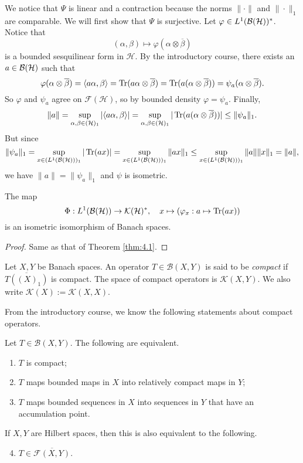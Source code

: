 \begin{myproof}
  We notice that $\Psi$ is linear and a contraction because the norms $\|\cdot \|$
  and $\| \cdot \|_1$ are comparable. We will first show that $\Psi$ is surjective.
  Let $\varphi \in L^1 (\operatorname{\mathcal{B} (\mathcal{H})})^*$. Notice that 
  $$(\alpha, \beta) \mapsto \varphi(\alpha \otimes \overline{\beta})$$
  is a bounded sesquilinear form in $\mathcal{H}$. By the introductory course, there exists 
  an $a \in \operatorname{\mathcal{B} (\mathcal{H})}$ such that 
  $$\varphi(\alpha \otimes \overline{\beta}) = \langle a \alpha, \beta \rangle = \operatorname{Tr} (a\alpha \otimes \overline{\beta}) = \operatorname{Tr} (a(\alpha \otimes \overline{\beta})) = \psi_a (\alpha \otimes \overline{\beta}).$$
  So $\varphi$ and $\psi_a$ agree on $\mathcal{F} (\mathcal{H})$, so by bounded density $\varphi = \psi_a$.
  Finally, 
  $$\| a\| = \sup_{\alpha, \beta \in (\mathcal{H})_1} |\langle a \alpha, \beta \rangle| = \sup_{\alpha, \beta \in (\mathcal{H})_1} |\operatorname{Tr} (a (\alpha \otimes \overline{\beta})) | \leq \| \psi_a \|_1.$$
  But since 
  $$\| \psi_a \|_1 = \sup_{x \in (L^1(\operatorname{\mathcal{B} (\mathcal{H})}))_1} |\operatorname{Tr} (ax)| = \sup_{x \in (L^1(\operatorname{\mathcal{B} (\mathcal{H})}))_1} \| ax \|_1 \leq \sup_{x \in (L^1(\operatorname{\mathcal{B} (\mathcal{H})}))_1} \| a \| \|x \|_1 = \| a\|,$$
  we have $\| a\| = \| \psi_a\|_1$ and $\psi$ is isometric.
\end{myproof}

\begin{corollary}
  The map $$\Phi: L^1 (\operatorname{\mathcal{B} (\mathcal{H})}) \to \mathcal{K} (\mathcal{H})^*, \quad x \mapsto (\varphi_x: a \mapsto \operatorname{Tr} (ax))$$
  is an isometric isomorphism of Banach spaces.
\end{corollary}

\begin{proof}
  Same as that of Theorem \ref{thm:4.1}.
\end{proof}

\begin{definition}
  Let $X, Y$ be Banach spaces. An operator $T\in \mathcal{B}(X, Y)$ is said to be \emph{compact}
  if $\overline{T((X)_1)}$ is compact. The space of compact operators is $\mathcal{K} (X, Y)$.
  We also write $\mathcal{K} (X) := \mathcal{K} (X, X)$.
\end{definition}

From the introductory course, we know the following statements about compact operators.

\begin{proposition}
  Let $T \in \mathcal{B}(X, Y)$. The following are equivalent.
  \begin{enumerate}
    \item $T$ is compact;
    \item $T$ maps bounded maps in $X$ into relatively compact maps in $Y$;
    \item $T$ maps bounded sequences in $X$ into sequences in $Y$ that have an accumulation point.
  \end{enumerate}
  If $X, Y$ are Hilbert spaces, then this is also equivalent to the following.
  \begin{enumerate}\setcounter{enumi}{3}
    \item $T \in \overline{\mathcal{F}(X, Y)}$.
  \end{enumerate}
\end{proposition}

